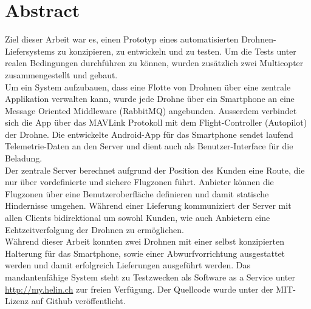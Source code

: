\newpage
{}
\chapter*{Abstract}

Ziel dieser Arbeit war es, einen Prototyp eines automatisierten Drohnen-Liefersystems zu konzipieren, zu entwickeln und zu testen. Um die Tests unter realen Bedingungen durchführen zu können, wurden zusätzlich zwei Multicopter zusammengestellt und gebaut.\\

Um ein System aufzubauen, dass eine Flotte von Drohnen über eine zentrale Applikation verwalten kann, wurde jede Drohne über ein Smartphone an eine Message Oriented Middleware (RabbitMQ) angebunden. Ausserdem verbindet sich die App über das \Gls{MAVLink} Protokoll mit dem \Gls{Flight-Controller} (Autopilot) der Drohne. 
Die entwickelte Android-App für das Smartphone sendet laufend Telemetrie-Daten an den Server und dient auch als Benutzer-Interface für die Beladung. \\

Der zentrale Server berechnet aufgrund der Position des Kunden eine Route, die nur über vordefinierte und sichere Flugzonen führt. Anbieter können die Flugzonen über eine Benutzeroberfläche definieren und damit statische Hindernisse umgehen. Während einer Lieferung kommuniziert der Server mit allen Clients bidirektional um sowohl Kunden, wie auch Anbietern eine Echtzeitverfolgung der Drohnen zu ermöglichen. \\

Während dieser Arbeit konnten zwei Drohnen mit einer selbst konzipierten Halterung für das Smartphone, sowie einer Abwurfvorrichtung ausgestattet werden und damit erfolgreich Lieferungen ausgeführt werden. Das mandantenfähige System steht zu Testzwecken als Software as a Service unter \url{http://my.helin.ch} zur freien Verfügung. Der Quellcode wurde unter der MIT-Lizenz auf Github veröffentlicht.
